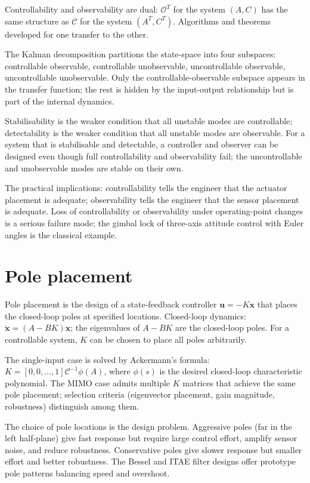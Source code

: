 Controllability and observability are dual: $\mathcal{O}^T$ for the system $(A, C)$ has the same structure as $\mathcal{C}$ for the system $(A^T, C^T)$. Algorithms and theorems developed for one transfer to the other.

The Kalman decomposition partitions the state-space into four subspaces: controllable observable, controllable unobservable, uncontrollable observable, uncontrollable unobservable. Only the controllable-observable subspace appears in the transfer function; the rest is hidden by the input-output relationship but is part of the internal dynamics.

Stabilisability is the weaker condition that all unstable modes are controllable; detectability is the weaker condition that all unstable modes are observable. For a system that is stabilisable and detectable, a controller and observer can be designed even though full controllability and observability fail; the uncontrollable and unobservable modes are stable on their own.

The practical implications: controllability tells the engineer that the actuator placement is adequate; observability tells the engineer that the sensor placement is adequate. Loss of controllability or observability under operating-point changes is a serious failure mode; the gimbal lock of three-axis attitude control with Euler angles is the classical example.

\section{Pole placement}

Pole placement is the design of a state-feedback controller $\mathbf{u} = -K \mathbf{x}$ that places the closed-loop poles at specified locations. Closed-loop dynamics: $\dot{\mathbf{x}} = (A - BK) \mathbf{x}$; the eigenvalues of $A - BK$ are the closed-loop poles. For a controllable system, $K$ can be chosen to place all poles arbitrarily.

The single-input case is solved by Ackermann's formula: $K = [0, 0, \ldots, 1] \mathcal{C}^{-1} \phi(A)$, where $\phi(s)$ is the desired closed-loop characteristic polynomial. The MIMO case admits multiple $K$ matrices that achieve the same pole placement; selection criteria (eigenvector placement, gain magnitude, robustness) distinguish among them.

The choice of pole locations is the design problem. Aggressive poles (far in the left half-plane) give fast response but require large control effort, amplify sensor noise, and reduce robustness. Conservative poles give slower response but smaller effort and better robustness. The Bessel and ITAE filter designs offer prototype pole patterns balancing speed and overshoot.

